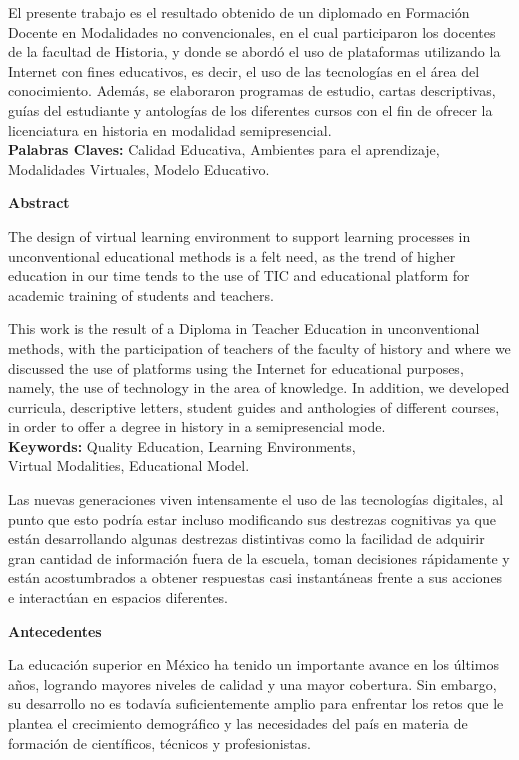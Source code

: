 El presente trabajo es el resultado obtenido de un diplomado en Formación Docente
en Modalidades no convencionales, en el cual participaron los docentes de
la facultad de Historia, y donde se abordó el uso de plataformas utilizando
la Internet con fines educativos, es decir, el  uso de las tecnologías en el
área del conocimiento. Además, se elaboraron  programas de estudio, cartas
descriptivas, guías del estudiante y antologías de los diferentes cursos
con el fin de ofrecer la licenciatura en historia en modalidad
semipresencial.\\ 
\textbf{Palabras Claves:} Calidad Educativa, Ambientes para el aprendizaje,
Modalidades Virtuales, Modelo Educativo.


\medskip
\textbf{Abstract}

The design of virtual
learning environment to support learning processes in unconventional
educational methods is a felt need, as the trend of higher education in our
time tends to the use of TIC and educational platform for academic
training of students and teachers.

This work is the result of
a Diploma in Teacher Education in unconventional methods, with the
participation of teachers of the faculty of history and where we discussed
the use of platforms using the Internet for educational purposes, namely,
the use of technology in the area of knowledge. In addition, we developed
curricula, descriptive letters, student guides and anthologies of different
courses, in order to offer a degree in history in a semipresencial mode.\\
\textbf{Keywords:} Quality Education, Learning Environments,\\ Virtual Modalities,
Educational Model.


\medskip
Las nuevas generaciones viven intensamente el uso de las tecnologías
digitales, al punto que esto podría estar incluso modificando sus destrezas
cognitivas ya que están desarrollando algunas destrezas distintivas como la
facilidad de  adquirir  gran cantidad de información fuera de la escuela,
toman decisiones rápidamente y están acostumbrados a obtener respuestas
casi instantáneas frente a sus acciones e interactúan en espacios
diferentes.


\medskip
\textbf{Antecedentes}

\enlargethispage{1\baselineskip}
La educación superior en México ha tenido un importante
avance en los últimos años, logrando mayores niveles de calidad y una mayor
cobertura.  Sin embargo, su desarrollo no es todavía suficientemente amplio
para enfrentar los retos que le plantea el crecimiento demográfico y las
necesidades del país en materia de formación de científicos, técnicos y
profesionistas. 

